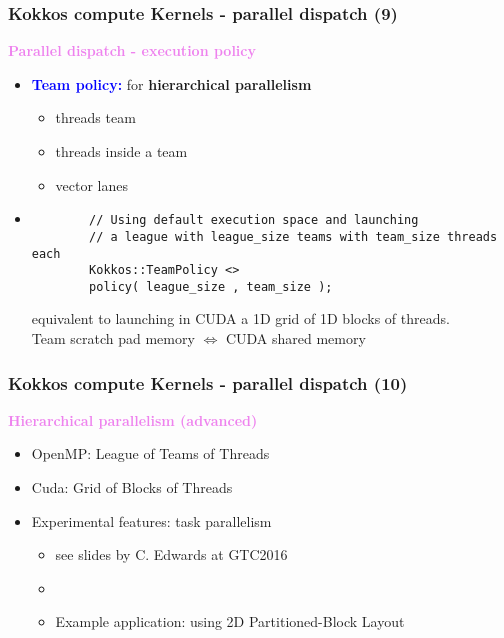 \begin{frame}[fragile=singleslide]
  \frametitle{Kokkos compute Kernels - parallel dispatch (9)}
  
  {\Large \textcolor{violet}{\textbf{Parallel dispatch - execution policy}}}

  \begin{itemize}
  \item \textcolor{blue}{\bf Team policy:} for {\bf hierarchical parallelism}
    \begin{itemize}
    \item threads team %
    \item threads inside a team %
    \item vector lanes
    \end{itemize}
  \item 
    {\small
      \begin{verbatim}
        // Using default execution space and launching
        // a league with league_size teams with team_size threads each
        Kokkos::TeamPolicy <>
        policy( league_size , team_size );
      \end{verbatim}
    }
    equivalent to launching in CUDA a 1D grid of 1D blocks of threads.\\
    Team scratch pad memory $\Longleftrightarrow$ CUDA shared memory
  \end{itemize}
\end{frame}
  
\begin{frame}[fragile=singleslide]
  \frametitle{Kokkos compute Kernels - parallel dispatch (10)}
  
  {\Large \textcolor{violet}{\textbf{Hierarchical parallelism (advanced)}}}

  \begin{itemize}
  \item OpenMP: League of Teams of Threads
  \item Cuda: Grid of Blocks of Threads
  \item Experimental features: task parallelism
    \begin{itemize}
    \item {\small see slides by C. Edwards at GTC2016 }
    \item {}
    \item Example application: 
using 2D Partitioned-Block Layout
    \end{itemize}
  \end{itemize}
  
\end{frame}
